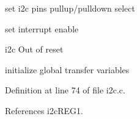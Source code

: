\begin{DoxyItemize}
\item set i2c pins pullup/pulldown select ~\newline
~\newline
~\newline

\item set interrupt enable ~\newline
~\newline

\item i2c Out of reset ~\newline

\item initialize global transfer variables 
\end{DoxyItemize}

Definition at line 74 of file i2c.\+c.



References i2c\+R\+E\+G1.


